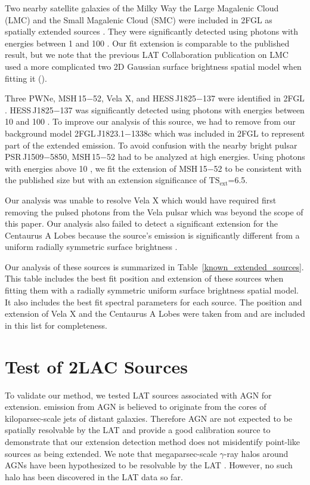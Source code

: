 \documentclass[12pt,preprint]{aastex}
\newcommand{\gev}{\text{GeV}\xspace}
\newcommand{\tsext}{{\ensuremath{\text{TS}_{\text{ext}}}}\xspace}
\begin{document}
Two nearby satellite galaxies of the Milky Way the Large Magalenic Cloud (LMC)
and the Small Magalenic
Cloud (SMC) were included in 2FGL as spatially extended sources \citep{lmc,smc}.  They were significantly
detected using photons with energies between
1 \gev and 100 \gev. Our
fit extension is comparable to the published result, but we note that
the previous LAT Collaboration publication on LMC used a more complicated two 2D Gaussian surface
brightness spatial model when fitting it (\citep{lmc}).

Three PWNe, MSH\,15$-$52, Vela X, and HESS\,J1825$-$137 were
identified in 2FGL \citep{msh1552,velax,fermi_hess_j1825}.  
HESS\,J1825$-$137 was significantly detected using photons
with energies between 10 \gev and 100 \gev.
To improve our analysis of this source, we had to remove
from our background model 
2FGL\,J1823.1$-$1338c which was included in 2FGL to
represent part of the extended emission.
To avoid confusion with the nearby bright pulsar PSR\,J1509$-$5850, MSH\,15$-$52 had
to be
analyzed at high energies.  Using photons with energies above 10 \gev,
we fit the extension of MSH\,15$-$52 to be consistent with the published
size but with an extension significance of \tsext=6.5.  

Our analysis was unable to resolve Vela X which would have required first
removing the pulsed photons from the Vela pulsar which was beyond the
scope of this paper.  Our analysis also failed to detect a significant
extension for the Centaurus A Lobes because
the source's emission is significantly different from a uniform
radially symmetric surface brightness \citep{cen_a_lat}.

Our analysis of these sources is summarized in
Table~\ref{known_extended_sources}.  This table includes the best fit
position and extension of these sources when fitting them 
with a radially symmetric uniform surface brightness spatial model. It also
includes the best fit spectral parameters for each source.  The position
and extension of Vela X and the Centaurus A Lobes were taken from
\cite{velax,cen_a_lat} and are included in this list for completeness.

\section{Test of 2LAC Sources}
\label{test_2lac_sources}

To validate our method, we tested LAT sources associated with AGN for
extension.  \gev emission from AGN is believed to originate from the
cores of kiloparsec-scale jets of distant galaxies.  Therefore AGN are
not expected to be spatially resolvable by the LAT and provide a good
calibration source to demonstrate that our extension detection method
does not misidentify point-like sources as being extended.  We note that
megaparsec-scale $\gamma$-ray halos around AGNs have been hypothesized
to be resolvable by the LAT \citep{pair_halo_paper}. However, no such
halo has been discovered in the LAT data so far.
\end{document}
